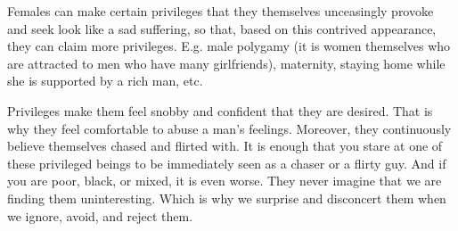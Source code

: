 \par Females can make certain privileges that they themselves unceasingly provoke and seek look like a sad suffering, so that, based on this contrived appearance, they can claim more privileges. E.g. male polygamy (it is women themselves who are attracted to men who have many girlfriends), maternity, staying home while she is supported by a rich man, etc.

\par Privileges make them feel snobby and confident that they are desired. That is why they feel comfortable to abuse a man's feelings. Moreover, they continuously believe themselves chased and flirted with. It is enough that you stare at one of these privileged beings to be immediately seen as a chaser or a flirty guy. And if you are poor, black, or mixed, it is even worse. They never imagine that we are finding them uninteresting. Which is why we surprise and disconcert them when we ignore, avoid, and reject them.